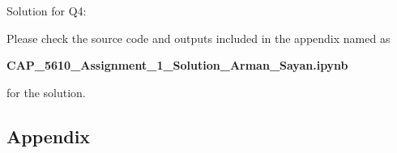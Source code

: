 \documentclass[12pt,letterpaper, onecolumn]{exam}
\begin{document}
\begin{questions}

    Solution for Q4:

    \begin{solution}

        Please check the source code and outputs included in the appendix named as
    
        \begin{center}
            \textbf{CAP\_5610\_Assignment\_1\_Solution\_Arman\_Sayan.ipynb}
        \end{center}
            
        for the solution.
    \end{solution}

    \pagebreak
    
\end{questions}

\begin{appendix}
    \centering
    \begin{flushleft}  
      \section{Appendix}
      
    \end{flushleft}
\end{appendix}
\end{document}
